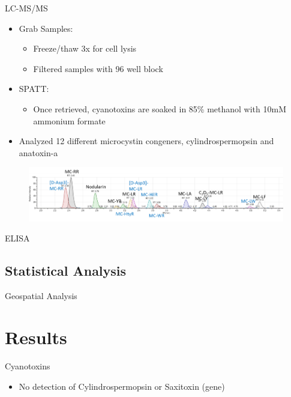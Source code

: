 \begin{frame}{LC-MS/MS}
	\begin{itemize}
		\item Grab Samples: 
		\begin{itemize}
			\item Freeze/thaw 3x for cell lysis 
			\item Filtered samples with 96 well block 
		\end{itemize}
		\item SPATT: 
		\begin{itemize}
			\item Once retrieved, cyanotoxins are soaked in 85\% methanol with 10mM ammonium formate
		\end{itemize}
		\item Analyzed 12 different microcystin congeners, cylindrospermopsin and anatoxin-a
	\end{itemize}
	\begin{figure}
		\includegraphics[width=\textwidth]{../figures/LCMS_CONGENERS.png}
	\end{figure}
\end{frame}

\begin{frame}{ELISA}

\end{frame}

\subsection{Statistical Analysis}
\begin{frame}{Geospatial Analysis}

\end{frame}
\section{Results}
\begin{frame}{Cyanotoxins}
	\begin{itemize}
		\item No detection of Cylindrospermopsin or Saxitoxin (gene)
	\end{itemize}

	

\end{frame}

